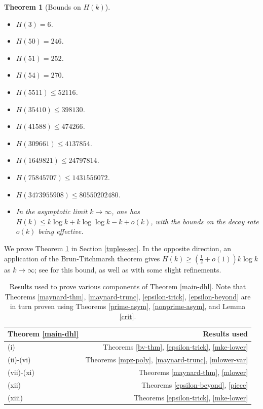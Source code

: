 \documentclass{bmcart}
\theoremstyle{plain}
\newtheorem{theorem}{Theorem}[section]
\theoremstyle{definition}
\begin{document}
\begin{theorem}[Bounds on $H(k)$]\label{hk-bound}\
\begin{itemize}
\item[(xii)] $H(3)=6$.
\item[(i)] $H(50) = 246$.
\item[(xiii)] $H(51) = 252$.
\item[(vii)] $H(54) = 270$.
\item[(viii)] $H(\num{5511}) \leq \num{52116}$.
\item[(ii)] $H(\num{35410}) \leq \num{398130}$.
\item[(ix)] $H(\num{41588}) \leq \num{474266}$.
\item[(x)] $H(\num{309661}) \leq \num{4137854}$.
\item[(iii)] $H(\num{1649821}) \leq \num{24797814}$.
\item[(iv)] $H(\num{75845707}) \leq \num{1431556072}$.
\item[(v)] $H(\num{3473955908}) \leq \num{80550202480}$.
\item[(vi), (xi)] In the asymptotic limit $k \to \infty$, one has $H(k) \leq k \log k + k \log\log k - k + o(k)$, with the bounds on the decay rate $o(k)$ being effective.
\end{itemize}
\end{theorem}

We prove Theorem \ref{hk-bound} in Section \ref{tuples-sec}.  In the opposite direction, an application of the Brun-Titchmarsh theorem gives $H(k) \geq (\frac{1}{2} + o(1)) k \log k$ as $k \to \infty$; see \cite[\S 3.9]{polymath8a-unabridged} for this bound, as well as with some slight refinements.

\begin{table}
\centering
\setlength{\extrarowheight}{2pt}
\caption{Results used to prove various components of Theorem \ref{main-dhl}. Note that Theorems \ref{maynard-thm}, \ref{maynard-trunc}, \ref{epsilon-trick}, \ref{epsilon-beyond} are in turn proven using Theorems \ref{prime-asym}, \ref{nonprime-asym}, and Lemma \ref{crit}.}\label{ingredients}
\begin{tabular}{lr}
\toprule
Theorem \ref{main-dhl}                 & Results used \\
\midrule
(i) & Theorems \ref{bv-thm}, \ref{epsilon-trick}, \ref{mke-lower} \\
(ii)-(vi) & Theorems \ref{mpz-poly}, \ref{maynard-trunc}, \ref{mlower-var} \\
(vii)-(xi) & Theorems \ref{maynard-thm}, \ref{mlower} \\
(xii) & Theorems \ref{epsilon-beyond}, \ref{piece} \\
(xiii) & Theorems \ref{epsilon-trick}, \ref{mke-lower} \\
\bottomrule
\end{tabular}
\end{table}
\end{document}

